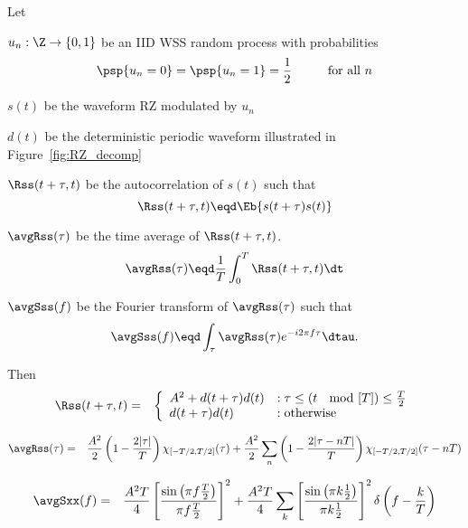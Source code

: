 \begin{theorem}
\label{thm:RZ_stat}
Let
\begin{liste}
   \item $u_n:\Z\to\{0,1\}$ be an IID WSS random process with probabilities 
         \[ \psp\{u_n=0\}=\psp\{u_n=1\}= \frac{1}{2} \hspace{1cm}\mbox{for all $n$}\]
   \item $s(t)$ be the waveform RZ modulated by $u_n$
   \item $d(t)$ be the deterministic periodic waveform illustrated in 
         Figure~\ref{fig:RZ_decomp}
   \item $\Rss(t+\tau,t)$ be the autocorrelation of $s(t)$ such that
         \[ \Rss(t+\tau,t) \eqd \Eb{s(t+\tau)s(t)}\]
   \item $\avgRss(\tau)$ be the time average of $\Rss(t+\tau,t)$.
         \[ \avgRss(\tau) \eqd \frac{1}{T}\int_0^T \Rss(t+\tau,t) \dt \]
   \item $\avgSss(f)$ be the Fourier transform of $\avgRss(\tau)$ such that
         \[ \avgSss(f) \eqd \int_\tau \avgRss(\tau) e^{-i2\pi f\tau} \dtau.\]
\end{liste}

Then 
\begin{eqnarray*}
   \Rss(t+\tau,t) 
     &=& 
         \left\{
         \begin{array}{ll}
            A^2 + d(t+\tau)d(t) & :\tau \le (t\;\mod[T])\le \frac{T}{2} \\
            d(t+\tau)d(t)       & :\mbox{otherwise}
         \end{array}
         \right.
\end{eqnarray*}

\begin{eqnarray*}
   \avgRss(\tau) 
     &=& \frac{A^2}{2}\left( 1- \frac{2|\tau|}{T}\right) \chi_{[-T/2,T/2]}(\tau) + 
         \frac{A^2}{2} \sum_n \left( 1 - \frac{2|\tau-nT|}{T} \right)\chi_{[-T/2,T/2]}(\tau-nT)
\end{eqnarray*}

\begin{eqnarray*}
   \avgSxx(f) 
     &=& \frac{A^2 T}{4} \left[ \frac{\sin\left(\pi f\frac{T}{2}\right)}{\pi f\frac{T}{2}}\right]^2 + 
         \frac{A^2 T}{4} \sum_k \left[ \frac{\sin\left(\pi k\frac{1}{2}\right)}{\pi k\frac{1}{2}}\right]^2 \delta\left(f-\frac{k}{T}\right) 
\end{eqnarray*}
\end{theorem}


